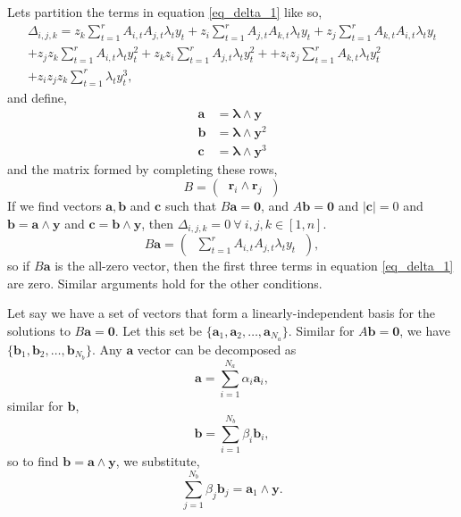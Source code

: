 \documentclass[11pt,a4paper]{article}
\begin{document}
 	Lets partition the terms in equation \eqref{eq_delta_1} like so,
 	\begin{multline}
 	\Delta_{i,j,k} = z_k\sum_{t=1}^r A_{i,t}A_{j,t} \lambda_t y_t + z_i\sum_{t=1}^r A_{j,t}A_{k,t} \lambda_t y_t + z_j\sum_{t=1}^r A_{k,t}A_{i,t} \lambda_t y_t \\
 	+ z_j z_k\sum_{t=1}^r A_{i,t} \lambda_t y_t^2 + z_k z_i\sum_{t=1}^r A_{j,t} \lambda_t y_t^2 + + z_i z_j\sum_{t=1}^r A_{k,t} \lambda_t y_t^2 \\
 	+ z_i z_j z_k\sum_{t=1}^r \lambda_t y_t^3,
 	\end{multline}
 	and define,
 	\begin{align}
 	\mathbf{a} &= \mathbf{\lambda} \wedge \mathbf{y} \\
 	\mathbf{b} &= \mathbf{\lambda} \wedge \mathbf{y}^2 \\
 	\mathbf{c} &= \mathbf{\lambda} \wedge \mathbf{y}^3
 	\end{align}
 	and the matrix formed by completing these rows,
 	\begin{equation}
 	B = \begin{pmatrix}
 	\ \mathbf{r}_i \wedge \mathbf{r}_j \
 	\end{pmatrix}
 	\end{equation}
 	If we find vectors $\mathbf{a},\mathbf{b}$ and $\mathbf{c}$ such that $B\mathbf{a} = \mathbf{0}$, and $A\mathbf{b} = \mathbf{0}$ and $|\mathbf{c}| = 0$ and $\mathbf{b} = \mathbf{a}\wedge \mathbf{y}$ and $\mathbf{c} = \mathbf{b}\wedge\mathbf{y}$, then $\Delta_{i,j,k} = 0 \ \forall \ i,j,k\in[1,n]$.
 	\begin{equation}
 	B\mathbf{a} = \begin{pmatrix}
 	\ \sum_{t=1}^{r}A_{i,t}A_{j,t} \lambda_t y_t \
 	\end{pmatrix},
 	\end{equation}
 	so if $B\mathbf{a}$ is the all-zero vector, then the first three terms in equation \eqref{eq_delta_1} are zero. Similar arguments hold for the other conditions.
 	
 	Let say we have a set of vectors that form a linearly-independent basis for the solutions to $B\mathbf{a} = \mathbf{0}$. Let this set be $\{\mathbf{a}_1, \mathbf{a}_2, \dots, \mathbf{a}_{N_a}\}$. Similar for $A\mathbf{b} = \mathbf{0}$, we have $\{\mathbf{b}_1,\mathbf{b}_2,\dots,\mathbf{b}_{N_b}\}$. Any $\mathbf{a}$ vector can be decomposed as
 	\begin{equation}
 	\mathbf{a} = \sum_{i=1}^{N_a} \alpha_i \mathbf{a}_i,
 	\end{equation}
 	similar for $\mathbf{b}$,
 	\begin{equation}
 	\mathbf{b} = \sum_{i=1}^{N_b} \beta_i \mathbf{b}_i,
 	\end{equation}
 	so to find $\mathbf{b} = \mathbf{a}\wedge \mathbf{y}$, we substitute,
 	\begin{equation}
 	\sum_{j=1}^{N_b} \beta_j \mathbf{b}_j = \mathbf{a}_1 \wedge \mathbf{y}.
 	\end{equation}
 	
 		
	
\end{document}
